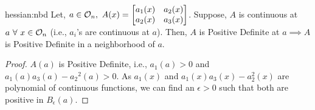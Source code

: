 \documentclass[../Analysis-3.tex]{subfiles}
\begin{document}
\begin{Lem}{}{hessian:nbd}
  Let, $a \in \mathcal{O}_{n},\ A(x) = \begin{bmatrix}
      a_1(x) & a_2(x) \\
      a_2(x) & a_3(x)
    \end{bmatrix}$. Suppose, $A$ is continuous at $a \ \forall\ x \in \mathcal{O}_{n}$ (i.e., $a_i$'s are continuous at $a$). Then, $A$ is Positive Definite at $a \implies A$ is Positive Definite in a neighborhood of $a$.
\end{Lem}

\begin{proof}
  $ A(a) $ is Positive Definite, i.e., $ a_1(a) > 0 $ and $ a_1(a) a_3(a) - {a_2}^2(a) > 0 $. As $ a_1(x) $ and $ a_1(x)a_3(x) - a_2^2(x) $ are polynomial of continuous functions, we can find an $ \epsilon > 0 $ such that both are positive in $ B_{\epsilon}(a) $.
\end{proof}
\end{document}

